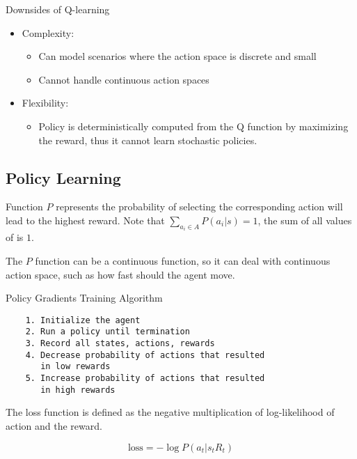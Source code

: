\documentclass[12pt, a4paper, oneside]{article}
\begin{document}
Downsides of Q-learning

\begin{itemize}
    \item Complexity:
    \begin{itemize}
        \item Can model scenarios where the action space is discrete and small
        \item Cannot handle continuous action spaces
    \end{itemize}
    \item Flexibility:
    \begin{itemize}
        \item Policy is deterministically computed from the Q function by maximizing the reward, thus it cannot learn stochastic policies.
    \end{itemize}
\end{itemize}

\subsection{Policy Learning}

Function $P$ represents the probability of selecting the corresponding action will lead to the highest reward. Note that $\sum_{a_{i}\in A}^{}P(a_{i}|s)=1$, the sum of all values of is $1$.

The $P$ function can be a continuous function, so it can deal with continuous action space, such as how fast should the agent move.

Policy Gradients Training Algorithm
\begin{lstlisting}
    1. Initialize the agent
    2. Run a policy until termination
    3. Record all states, actions, rewards
    4. Decrease probability of actions that resulted
       in low rewards
    5. Increase probability of actions that resulted
       in high rewards
\end{lstlisting}

The loss function is defined as the negative multiplication of log-likelihood of action and the reward.

\begin{equation*}
    \text{loss}=-\log P(a_{t}|s_{t}R_{t})
\end{equation*}
\end{document}

